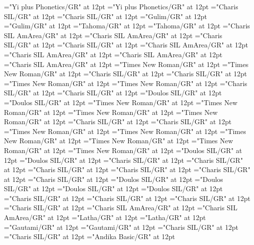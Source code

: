 \documentclass[a4paper,twoside]{article}
\begin{document}
\font\divii="Yi plus Phonetics/GR" at 12pt
\font\spanii="Yi plus Phonetics/GR" at 12pt
\font\divkm="Charis SIL/GR" at 12pt
\font\spankm="Charis SIL/GR" at 12pt
\font\divko="Gulim/GR" at 12pt
\font\spanko="Gulim/GR" at 12pt
\font\divlv="Tahoma/GR" at 12pt
\font\spanlv="Tahoma/GR" at 12pt
\font\divmiz="Charis SIL AmArea/GR" at 12pt
\font\spanmiz="Charis SIL AmArea/GR" at 12pt
\font\divms="Charis SIL/GR" at 12pt
\font\spanms="Charis SIL/GR" at 12pt
\font\divmxbfonipa="Charis SIL AmArea/GR" at 12pt
\font\spanmxbfonipa="Charis SIL AmArea/GR" at 12pt
\font\divmxb="Charis SIL AmArea/GR" at 12pt
\font\spanmxb="Charis SIL AmArea/GR" at 12pt
\font\divmy="Times New Roman/GR" at 12pt
\font\spanmy="Times New Roman/GR" at 12pt
\font\divne="Charis SIL/GR" at 12pt
\font\spanne="Charis SIL/GR" at 12pt
\font\divpt="Times New Roman/GR" at 12pt
\font\spanpt="Times New Roman/GR" at 12pt
\font\divqaafonipaxkal="Charis SIL/GR" at 12pt
\font\spanqaafonipaxkal="Charis SIL/GR" at 12pt
\font\divqaafonipaxyii="Doulos SIL/GR" at 12pt
\font\spanqaafonipaxyii="Doulos SIL/GR" at 12pt
\font\divqaaxfwt="Times New Roman/GR" at 12pt
\font\spanqaaxfwt="Times New Roman/GR" at 12pt
\font\divqaaxgot="Times New Roman/GR" at 12pt
\font\spanqaaxgot="Times New Roman/GR" at 12pt
\font\divqaaxkal="Charis SIL/GR" at 12pt
\font\spanqaaxkal="Charis SIL/GR" at 12pt
\font\divqaaxlel="Times New Roman/GR" at 12pt
\font\spanqaaxlel="Times New Roman/GR" at 12pt
\font\divqaaxpig="Times New Roman/GR" at 12pt
\font\spanqaaxpig="Times New Roman/GR" at 12pt
\font\divqaaxsim="Times New Roman/GR" at 12pt
\font\spanqaaxsim="Times New Roman/GR" at 12pt
\font\divqaaxsta="Doulos SIL/GR" at 12pt
\font\spanqaaxsta="Doulos SIL/GR" at 12pt
\font\divqaaZxxxxkalAUDIO="Charis SIL/GR" at 12pt
\font\spanqaaZxxxxkalAUDIO="Charis SIL/GR" at 12pt
\font\divro="Charis SIL/GR" at 12pt
\font\spanro="Charis SIL/GR" at 12pt
\font\divru="Charis SIL/GR" at 12pt
\font\spanru="Charis SIL/GR" at 12pt
\font\divsehfonipaxetic="Doulos SIL/GR" at 12pt
\font\spansehfonipaxetic="Doulos SIL/GR" at 12pt
\font\divsehfonipa="Doulos SIL/GR" at 12pt
\font\spansehfonipa="Doulos SIL/GR" at 12pt
\font\divsehZxxxxaudio="Charis SIL/GR" at 12pt
\font\spansehZxxxxaudio="Charis SIL/GR" at 12pt
\font\divseh="Charis SIL/GR" at 12pt
\font\spanseh="Charis SIL/GR" at 12pt
\font\divstp="Charis SIL AmArea/GR" at 12pt
\font\spanstp="Charis SIL AmArea/GR" at 12pt
\font\divta="Latha/GR" at 12pt
\font\spanta="Latha/GR" at 12pt
\font\divte="Gautami/GR" at 12pt
\font\spante="Gautami/GR" at 12pt
\font\divth="Charis SIL/GR" at 12pt
\font\spanth="Charis SIL/GR" at 12pt
\font\divtpi="Andika Basic/GR" at 12pt
\end{document}

